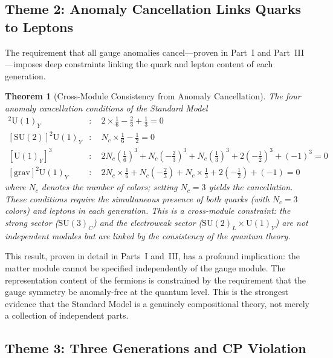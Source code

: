 \documentclass[12pt]{article}
\newtheorem{theorem}{Theorem}[section]
\theoremstyle{definition}
\theoremstyle{remark}
\newcommand{\su}[1]{\mathrm{SU}(#1)}
\newcommand{\uu}[1]{\mathrm{U}(#1)}
\begin{document}
\subsection{Theme 2: Anomaly Cancellation Links Quarks to Leptons}

The requirement that all gauge anomalies cancel---proven in Part~I and Part~III---imposes deep constraints linking the quark and lepton content of each generation.

\begin{theorem}[Cross-Module Consistency from Anomaly Cancellation]
\label{thm:cross-module-anomaly}
The four anomaly cancellation conditions of the Standard Model
\begin{align}
[\su{3}]^2\uu{1}_Y &: \quad 2 \times \tfrac{1}{6} - \tfrac{2}{3} + \tfrac{1}{3} = 0 \label{eq:anom1}\\
[\su{2}]^2\uu{1}_Y &: \quad N_c \times \tfrac{1}{6} - \tfrac{1}{2} = 0 \label{eq:anom2}\\
[\uu{1}_Y]^3 &: \quad 2N_c(\tfrac{1}{6})^3 + N_c(-\tfrac{2}{3})^3 + N_c(\tfrac{1}{3})^3 + 2(-\tfrac{1}{2})^3 + (-1)^3 = 0 \label{eq:anom3}\\
[\mathrm{grav}]^2\uu{1}_Y &: \quad 2N_c \times \tfrac{1}{6} + N_c(-\tfrac{2}{3}) + N_c \times \tfrac{1}{3} + 2(-\tfrac{1}{2}) + (-1) = 0 \label{eq:anom4}
\end{align}
where $N_c$ denotes the number of colors; setting $N_c = 3$ yields the cancellation. These conditions require the simultaneous presence of both quarks (with $N_c = 3$ colors) and leptons in each generation. This is a cross-module constraint: the strong sector ($\su{3}_C$) and the electroweak sector ($\su{2}_L \times \uu{1}_Y$) are not independent modules but are linked by the consistency of the quantum theory.
\end{theorem}

This result, proven in detail in Parts~I and~III, has a profound implication: the matter module cannot be specified independently of the gauge module. The representation content of the fermions is constrained by the requirement that the gauge symmetry be anomaly-free at the quantum level. This is the strongest evidence that the Standard Model is a genuinely compositional theory, not merely a collection of independent parts.

\subsection{Theme 3: Three Generations and CP Violation}
\end{document}
